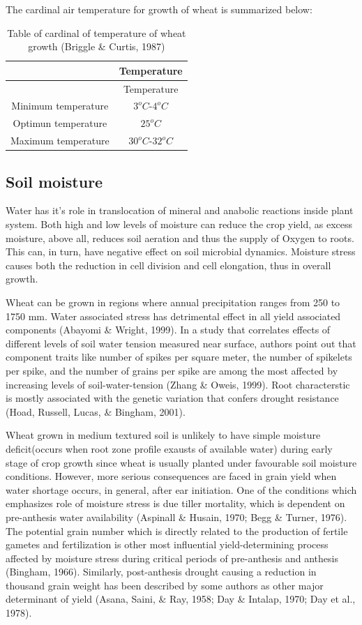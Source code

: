\documentclass[12pt,oneside]{dukestatscithesis} %
\begin{document}
The cardinal air temperature for growth of wheat is summarized below:
\begin{longtable}[]{@{}cc@{}}
\caption{Table of cardinal of temperature of wheat growth (Briggle \& Curtis, 1987)}\tabularnewline
\toprule
& Temperature\tabularnewline
\midrule
\endfirsthead
\toprule
& Temperature\tabularnewline
\midrule
\endhead
Minimum temperature & \(3^oC\)-\(4^oC\)\tabularnewline
Optimun temperature & \(25^oC\)\tabularnewline
Maximum temperature & \(30^oC\)-\(32^oC\)\tabularnewline
\bottomrule
\end{longtable}
\hypertarget{soil-moisture}{%
\subsection{Soil moisture}\label{soil-moisture}}

Water has it's role in translocation of mineral and anabolic reactions inside plant system. Both high and low levels of moisture can reduce the crop yield, as excess moisture, above all, reduces soil aeration and thus the supply of Oxygen to roots. This can, in turn, have negative effect on soil microbial dynamics. Moisture stress causes both the reduction in cell division and cell elongation, thus in overall growth.

Wheat can be grown in regions where annual precipitation ranges from 250 to 1750 mm. Water associated stress has detrimental effect in all yield associated components (Abayomi \& Wright, 1999). In a study that correlates effects of different levels of soil water tension measured near surface, authors point out that component traits like number of spikes per square meter, the number of spikelets per spike, and the number of grains per spike are among the most affected by increasing levels of soil-water-tension (Zhang \& Oweis, 1999). Root characterstic is mostly associated with the genetic variation that confers drought resistance (Hoad, Russell, Lucas, \& Bingham, 2001).

Wheat grown in medium textured soil is unlikely to have simple moisture deficit(occurs when root zone profile exausts of available water) during early stage of crop growth since wheat is usually planted under favourable soil moisture conditions. However, more serious consequences are faced in grain yield when water shortage occurs, in general, after ear initiation. One of the conditions which emphasizes role of moisture stress is due tiller mortality, which is dependent on pre-anthesis water availability (Aspinall \& Husain, 1970; Begg \& Turner, 1976). The potential grain number which is directly related to the production of fertile gametes and fertilization is other most influential yield-determining process affected by moisture stress during critical periods of pre-anthesis and anthesis (Bingham, 1966). Similarly, post-anthesis drought causing a reduction in thousand grain weight has been described by some authors as other major determinant of yield (Asana, Saini, \& Ray, 1958; Day \& Intalap, 1970; Day et al., 1978).
\end{document}
